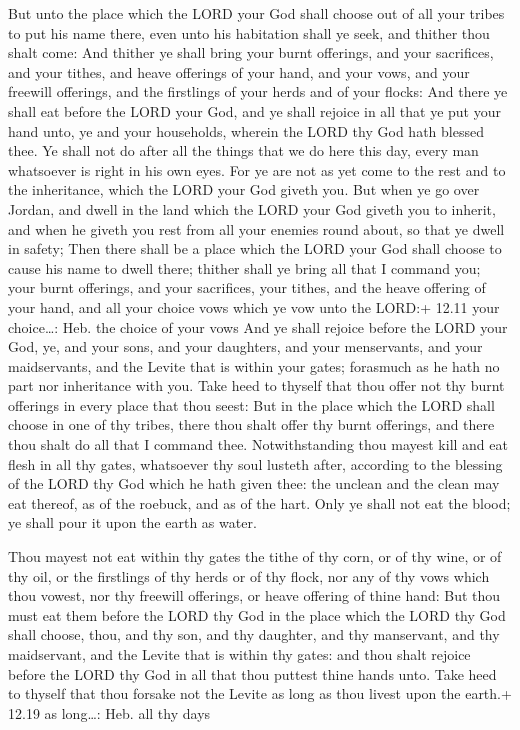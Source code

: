  But unto the place which the LORD your God shall choose out
of all your tribes to put his name there, even unto his habitation shall
ye seek, and thither thou shalt come:  And thither ye shall
bring your burnt offerings, and your sacrifices, and your tithes, and
heave offerings of your hand, and your vows, and your freewill
offerings, and the firstlings of your herds and of your flocks:
 And there ye shall eat before the LORD your God, and ye
shall rejoice in all that ye put your hand unto, ye and your households,
wherein the LORD thy God hath blessed thee.  Ye shall not do
after all the things that we do here this day, every man whatsoever is
right in his own eyes.  For ye are not as yet come to the
rest and to the inheritance, which the LORD your God giveth you.
 But when ye go over Jordan, and dwell in the land which
the LORD your God giveth you to inherit, and when he giveth you rest
from all your enemies round about, so that ye dwell in safety;
 Then there shall be a place which the LORD your God shall
choose to cause his name to dwell there; thither shall ye bring all that
I command you; your burnt offerings, and your sacrifices, your tithes,
and the heave offering of your hand, and all your choice vows which ye
vow unto the LORD:+ 12.11 your choice\ldots: Heb. the choice of your
vows  And ye shall rejoice before the LORD your God, ye,
and your sons, and your daughters, and your menservants, and your
maidservants, and the Levite that is within your gates; forasmuch as he
hath no part nor inheritance with you.  Take heed to
thyself that thou offer not thy burnt offerings in every place that thou
seest:  But in the place which the LORD shall choose in one
of thy tribes, there thou shalt offer thy burnt offerings, and there
thou shalt do all that I command thee.  Notwithstanding
thou mayest kill and eat flesh in all thy gates, whatsoever thy soul
lusteth after, according to the blessing of the LORD thy God which he
hath given thee: the unclean and the clean may eat thereof, as of the
roebuck, and as of the hart.  Only ye shall not eat the
blood; ye shall pour it upon the earth as water.

 Thou mayest not eat within thy gates the tithe of thy
corn, or of thy wine, or of thy oil, or the firstlings of thy herds or
of thy flock, nor any of thy vows which thou vowest, nor thy freewill
offerings, or heave offering of thine hand:  But thou must
eat them before the LORD thy God in the place which the LORD thy God
shall choose, thou, and thy son, and thy daughter, and thy manservant,
and thy maidservant, and the Levite that is within thy gates: and thou
shalt rejoice before the LORD thy God in all that thou puttest thine
hands unto.  Take heed to thyself that thou forsake not the
Levite as long as thou livest upon the earth.+ 12.19 as long\ldots: Heb.
all thy days

